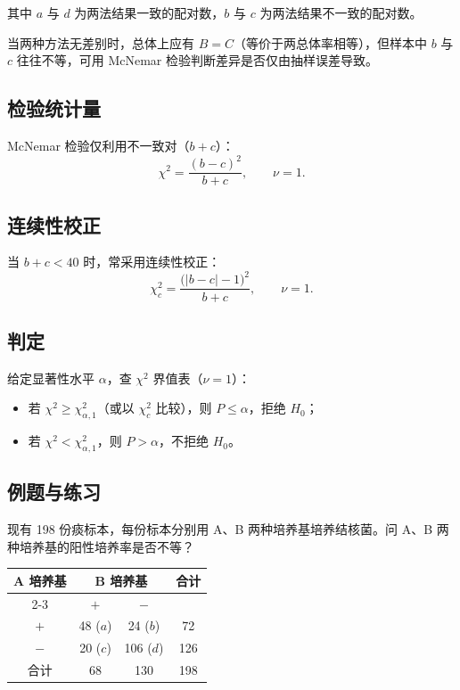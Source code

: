 \documentclass[lang=cn,10pt]{elegantbook}
\begin{document}
其中 $a$ 与 $d$ 为两法结果一致的配对数，$b$ 与 $c$ 为两法结果不一致的配对数。

当两种方法无差别时，总体上应有 $B=C$（等价于两总体率相等），但样本中 $b$ 与 $c$ 往往不等，可用 McNemar 检验判断差异是否仅由抽样误差导致。

\subsection{检验统计量}
McNemar 检验仅利用不一致对（$b+c$）：
\begin{equation}
  \chi^2=\frac{(b-c)^2}{b+c},\qquad \nu=1.
\end{equation}

\subsection{连续性校正}
当 $b+c<40$ 时，常采用连续性校正：
\begin{equation}
  \chi_c^2=\frac{\bigl(|b-c|-1\bigr)^2}{b+c},\qquad \nu=1.
\end{equation}

\subsection{判定}
给定显著性水平 $\alpha$，查 $\chi^2$ 界值表（$\nu=1$）：
\begin{itemize}
  \item 若 $\chi^2\ge \chi^2_{\alpha,1}$（或以 $\chi_c^2$ 比较），则 $P\le\alpha$，拒绝 $H_0$；
  \item 若 $\chi^2< \chi^2_{\alpha,1}$，则 $P>\alpha$，不拒绝 $H_0$。
\end{itemize}

\subsection{例题与练习}

\begin{exercise}
现有 198 份痰标本，每份标本分别用 A、B 两种培养基培养结核菌。问 A、B 两种培养基的阳性培养率是否不等？

\begin{center}
\begin{tabular}{cccc}
  \hline
  \multirow{2}{*}{A 培养基} & \multicolumn{2}{c}{B 培养基} & \multirow{2}{*}{合计}\\
  \cline{2-3}
  & $+$ & $-$ & \\
  \hline
  $+$ & 48 ($a$) & 24 ($b$) & 72\\
  $-$ & 20 ($c$) & 106 ($d$) & 126\\
  \hline
  合计 & 68 & 130 & 198\\
  \hline
\end{tabular}
\end{center}
\end{exercise}
\end{document}

